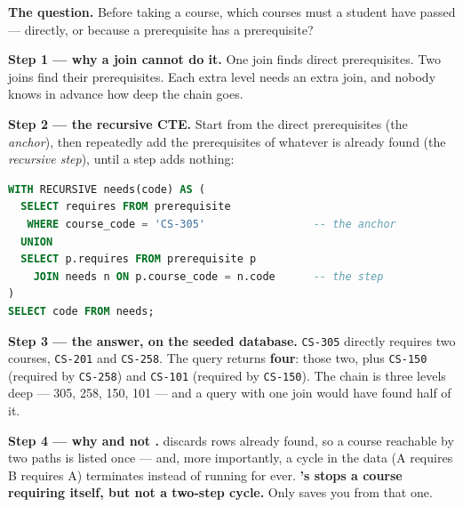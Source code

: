 \begin{worked}
\textbf{The question.} Before taking a course, which courses must a student
have passed --- directly, or because a prerequisite has a prerequisite?

\medskip
\textbf{Step 1 --- why a join cannot do it.} One join finds direct
prerequisites. Two joins find their prerequisites. Each extra level needs an
extra join, and nobody knows in advance how deep the chain goes.

\medskip
\textbf{Step 2 --- the recursive CTE.} Start from the direct prerequisites
(the \emph{anchor}), then repeatedly add the prerequisites of whatever is
already found (the \emph{recursive step}), until a step adds nothing:

\begin{lstlisting}[language=sql]
WITH RECURSIVE needs(code) AS (
  SELECT requires FROM prerequisite
   WHERE course_code = 'CS-305'                 -- the anchor
  UNION
  SELECT p.requires FROM prerequisite p
    JOIN needs n ON p.course_code = n.code      -- the step
)
SELECT code FROM needs;
\end{lstlisting}

\medskip
\textbf{Step 3 --- the answer, on the seeded database.} \texttt{CS-305}
directly requires two courses, \texttt{CS-201} and \texttt{CS-258}. The query
returns \textbf{four}: those two, plus \texttt{CS-150} (required by
\texttt{CS-258}) and \texttt{CS-101} (required by \texttt{CS-150}). The chain
is three levels deep --- 305, 258, 150, 101 --- and a query with one join
would have found half of it.

\medskip
\textbf{Step 4 --- why  and not .} 
discards rows already found, so a course reachable by two paths is listed
once --- and, more importantly, a cycle in the data (A requires B requires A)
terminates instead of running for ever. \textbf{'s
 stops a course requiring itself, but not a two-step cycle.} Only
 saves you from that one.
\end{worked}

